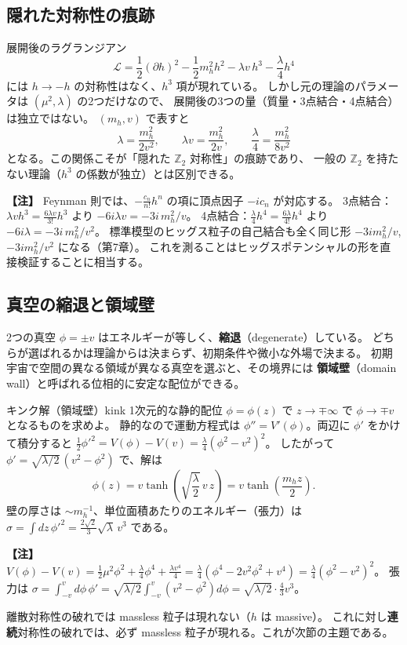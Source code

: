 \documentclass[uplatex,dvipdfmx,a4paper,11pt,openany]{jsbook}
\newcommand{\term}[2]{\textbf{#1}（#2）}
\newenvironment{note}{\vspace{1ex}\par\footnotesize\noindent\textbf{【注】}}{\par\vspace{1ex}}
\numberwithin{equation}{chapter}
\theoremstyle{definition}
\theoremstyle{plain}
\theoremstyle{remark}
\newcommand{\Lag}{\mathcal{L}}
\begin{document}
\subsection{隠れた対称性の痕跡}
展開後のラグランジアン
\begin{equation}
\Lag=\frac12(\partial h)^2-\frac12m_h^2h^2-\lambda v\,h^3-\frac\lambda4h^4
\end{equation}
には $h\to-h$ の対称性はなく、$h^3$ 項が現れている。
しかし元の理論のパラメータは $(\mu^2,\lambda)$ の2つだけなので、
展開後の3つの量（質量・3点結合・4点結合）は独立ではない。
$(m_h,v)$ で表すと
\begin{equation}
\lambda=\frac{m_h^2}{2v^2},\qquad
\lambda v=\frac{m_h^2}{2v},\qquad
\frac\lambda4=\frac{m_h^2}{8v^2}
\label{eq:Z2-couplings}
\end{equation}
となる。この関係こそが「隠れた $\mathbb Z_2$ 対称性」の痕跡であり、
一般の $\mathbb Z_2$ を持たない理論（$h^3$ の係数が独立）とは区別できる。
\begin{note}
Feynman 則では、$-\frac{c_n}{n!}h^n$ の項に頂点因子 $-ic_n$ が対応する。
3点結合：$\lambda v h^3=\frac{6\lambda v}{3!}h^3$ より $-6i\lambda v=-3i\,m_h^2/v$。
4点結合：$\frac\lambda4h^4=\frac{6\lambda}{4!}h^4$ より $-6i\lambda=-3i\,m_h^2/v^2$。
標準模型のヒッグス粒子の自己結合も全く同じ形 $-3im_h^2/v$, $-3im_h^2/v^2$ になる（第7章）。
これを測ることはヒッグスポテンシャルの形を直接検証することに相当する。
\end{note}
\subsection{真空の縮退と領域壁}
2つの真空 $\phi=\pm v$ はエネルギーが等しく、\term{縮退}{degenerate}している。
どちらが選ばれるかは理論からは決まらず、初期条件や微小な外場で決まる。
初期宇宙で空間の異なる領域が異なる真空を選ぶと、その境界には
\term{領域壁}{domain wall}と呼ばれる位相的に安定な配位ができる。
\begin{myex}{キンク解（領域壁）}{kink}
1次元的な静的配位 $\phi=\phi(z)$ で $z\to\mp\infty$ で $\phi\to\mp v$ となるものを求めよ。
\tcblower
静的なので運動方程式は $\phi''=V'(\phi)$。両辺に $\phi'$ をかけて積分すると
$\frac12\phi'^2=V(\phi)-V(v)=\frac\lambda4(\phi^2-v^2)^2$。
したがって $\phi'=\sqrt{\lambda/2}\,(v^2-\phi^2)$ で、解は
\[
\phi(z)=v\tanh\left(\sqrt{\frac\lambda2}\,v\,z\right)=v\tanh\left(\frac{m_hz}{2}\right).
\]
壁の厚さは $\sim m_h^{-1}$、単位面積あたりのエネルギー（張力）は
$\sigma=\int dz\,\phi'^2=\frac{2\sqrt2}{3}\sqrt\lambda\,v^3$ である。
\end{myex}
\begin{note}
$V(\phi)-V(v)=\frac12\mu^2\phi^2+\frac\lambda4\phi^4+\frac{\lambda v^4}{4}=\frac\lambda4(\phi^4-2v^2\phi^2+v^4)=\frac\lambda4(\phi^2-v^2)^2$。
張力は $\sigma=\int_{-v}^{v}d\phi\,\phi'=\sqrt{\lambda/2}\int_{-v}^{v}(v^2-\phi^2)d\phi=\sqrt{\lambda/2}\cdot\frac43v^3$。
\end{note}
離散対称性の破れでは massless 粒子は現れない（$h$ は massive）。
これに対し\textbf{連続}対称性の破れでは、必ず massless 粒子が現れる。これが次節の主題である。
\end{document}
